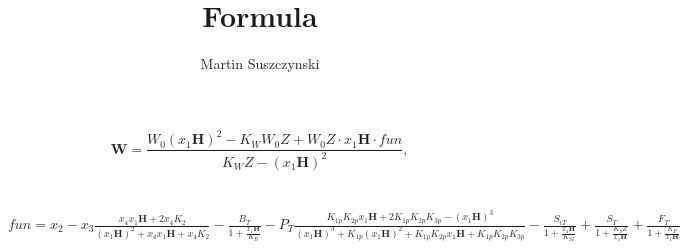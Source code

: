 \documentclass[a4paper,11pt]{report}
\title{Formula}
\author{Martin Suszczynski}
\begin{document}
\[ \textbf{W}=\frac{W_{0}(x_{1}\textbf{H})^{2}-K_{W}W_{0}Z+W_{0}Z\cdot x_{1}\textbf{H}\cdot \textit{fun}}{K_{W}Z-(x_{1}\textbf{H})^{2}}, \] \\ \\
$ \textit{fun} = x_{2}-x_{3}\frac{x_{4}x_{1}\textbf{H}+2x_{4}K_{2}}{(x_{1}\textbf{H})^{2}+x_{4}x_{1}\textbf{H}+x_{4}K_{2}}-\frac{B_{T}}{1+\frac{x_{1}\textbf{H}}{K_{B}}}-P_{T}\frac{K_{1p}K_{2p}x_{1}\textbf{H}+2K_{1p}K_{2p}K_{3p}-(x_{1}\textbf{H})^{3}}{(x_{1}\textbf{H})^{3}+K_{1p}(x_{1}\textbf{H})^{2}+K_{1p}K_{2p}x_{1}\textbf{H}+K_{1p}K_{2p}K_{3p}}-\frac{S_{iT}}{1+\frac{x_{1}\textbf{H}}{K_{SI}}}+\frac{S_{T}}{1+\frac{K_{S}Z}{x_{1}\textbf{H}}}+\frac{F_{T}}{1+\frac{K_{F}}{x_{1}\textbf{H}}} $ \\
\end{document}
